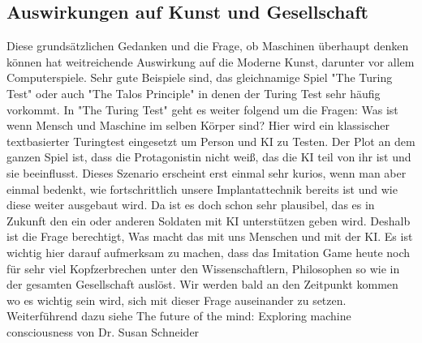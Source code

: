 \subsection{Auswirkungen auf Kunst und Gesellschaft}
Diese grundsätzlichen Gedanken und die Frage, ob Maschinen überhaupt denken können hat weitreichende Auswirkung auf die Moderne Kunst, darunter vor allem Computerspiele. Sehr gute Beispiele sind, das gleichnamige Spiel "The Turing Test" oder auch "The Talos Principle" in denen der Turing Test sehr häufig vorkommt. In "The Turing Test" geht es weiter folgend um die Fragen: Was ist wenn Mensch und Maschine im selben Körper sind? Hier wird ein klassischer textbasierter Turingtest eingesetzt um Person und KI zu Testen. Der Plot an dem ganzen Spiel ist, dass die Protagonistin nicht weiß, das die KI teil von ihr ist und sie beeinflusst. Dieses Szenario erscheint erst einmal sehr kurios, wenn man aber einmal bedenkt, wie fortschrittlich unsere Implantattechnik bereits ist und wie diese weiter ausgebaut wird. Da ist es doch schon sehr plausibel, das es in Zukunft den ein oder anderen Soldaten mit KI unterstützen geben wird. Deshalb ist die Frage berechtigt, Was macht das mit uns Menschen und mit der KI. Es ist wichtig hier darauf aufmerksam zu machen, dass das Imitation Game heute noch für sehr viel Kopfzerbrechen unter den Wissenschaftlern, Philosophen so wie in der gesamten Gesellschaft auslöst. Wir werden bald an den Zeitpunkt kommen wo es wichtig sein wird, sich mit dieser Frage auseinander zu setzen. Weiterführend dazu siehe The future of the mind: Exploring machine consciousness von Dr. Susan Schneider\cite{explorecons}

